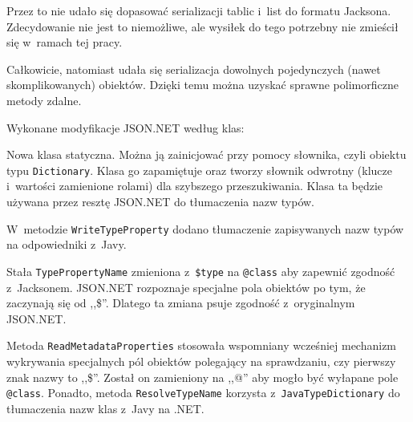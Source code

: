 Przez to nie udało się dopasować serializacji tablic i~list do formatu Jacksona. Zdecydowanie nie jest to niemożliwe, ale wysiłek do tego potrzebny nie zmieścił się w~ramach tej pracy. 

Całkowicie, natomiast udała się serializacja dowolnych pojedynczych (nawet skomplikowanych) obiektów. Dzięki temu można uzyskać sprawne polimorficzne metody zdalne.

Wykonane modyfikacje JSON.NET według klas:
\begin{description}
Nowa klasa statyczna. Można ją zainicjować przy pomocy słownika, czyli obiektu typu \texttt{Dictionary}. Klasa go zapamiętuje oraz tworzy słownik odwrotny (klucze i~wartości zamienione rolami) dla szybszego przeszukiwania. Klasa ta będzie używana przez resztę JSON.NET do tłumaczenia nazw typów.

W~metodzie \texttt{WriteTypeProperty} dodano tłumaczenie zapisywanych nazw typów na odpowiedniki z~Javy.

Stała \texttt{TypePropertyName} zmieniona z~\texttt{\$type} na \texttt{@class} aby zapewnić zgodność z~Jacksonem. JSON.NET rozpoznaje specjalne pola obiektów po tym, że zaczynają się od ,,\$''. Dlatego ta zmiana psuje zgodność z~oryginalnym JSON.NET.

Metoda \texttt{ReadMetadataProperties} stosowała wspomniany wcześniej mechanizm wykrywania specjalnych pól obiektów polegający na sprawdzaniu, czy  pierwszy znak nazwy to ,,\$''. Został on zamieniony na ,,@'' aby mogło być wyłapane pole \texttt{@class}. Ponadto, metoda \texttt{ResolveTypeName} korzysta z~\texttt{JavaTypeDictionary} do tłumaczenia nazw klas z~Javy na .NET.

\end{description}





